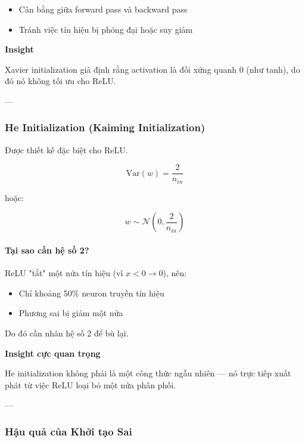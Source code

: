 \begin{itemize}
	\item Cân bằng giữa forward pass và backward pass
	\item Tránh việc tín hiệu bị phóng đại hoặc suy giảm
\end{itemize}

\begin{mdframed}[style=infobox]
	\textbf{Insight}
	
	Xavier initialization giả định rằng activation là đối xứng quanh 0 (như tanh), do đó nó không tối ưu cho ReLU.
\end{mdframed}

---

\subsubsection{He Initialization (Kaiming Initialization)}

Được thiết kế đặc biệt cho ReLU.

\[
\text{Var}(w) = \frac{2}{n_{in}}
\]

hoặc:

\[
w \sim \mathcal{N}\left(0, \frac{2}{n_{in}}\right)
\]

\paragraph{Tại sao cần hệ số 2?}

ReLU "tắt" một nửa tín hiệu (vì $x<0 \rightarrow 0$), nên:

\begin{itemize}
	\item Chỉ khoảng 50\% neuron truyền tín hiệu
	\item Phương sai bị giảm một nửa
\end{itemize}

Do đó cần nhân hệ số 2 để bù lại.

\begin{mdframed}[style=infobox]
	\textbf{Insight cực quan trọng}
	
	He initialization không phải là một công thức ngẫu nhiên — nó trực tiếp xuất phát từ việc ReLU loại bỏ một nửa phân phối.
\end{mdframed}

---

\subsubsection{Hậu quả của Khởi tạo Sai}

